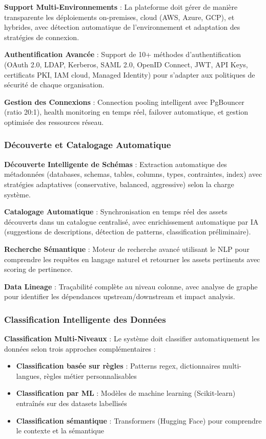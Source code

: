 \textbf{Support Multi-Environnements} : La plateforme doit gérer de manière transparente les déploiements on-premises, cloud (AWS, Azure, GCP), et hybrides, avec détection automatique de l'environnement et adaptation des stratégies de connexion.

\textbf{Authentification Avancée} : Support de 10+ méthodes d'authentification (OAuth 2.0, LDAP, Kerberos, SAML 2.0, OpenID Connect, JWT, API Keys, certificats PKI, IAM cloud, Managed Identity) pour s'adapter aux politiques de sécurité de chaque organisation.

\textbf{Gestion des Connexions} : Connection pooling intelligent avec PgBouncer (ratio 20:1), health monitoring en temps réel, failover automatique, et gestion optimisée des ressources réseau.

\subsubsection{Découverte et Catalogage Automatique}

\textbf{Découverte Intelligente de Schémas} : Extraction automatique des métadonnées (databases, schemas, tables, columns, types, contraintes, index) avec stratégies adaptatives (conservative, balanced, aggressive) selon la charge système.

\textbf{Catalogage Automatique} : Synchronisation en temps réel des assets découverts dans un catalogue centralisé, avec enrichissement automatique par IA (suggestions de descriptions, détection de patterns, classification préliminaire).

\textbf{Recherche Sémantique} : Moteur de recherche avancé utilisant le NLP pour comprendre les requêtes en langage naturel et retourner les assets pertinents avec scoring de pertinence.

\textbf{Data Lineage} : Traçabilité complète au niveau colonne, avec analyse de graphe pour identifier les dépendances upstream/downstream et impact analysis.

\subsubsection{Classification Intelligente des Données}

\textbf{Classification Multi-Niveaux} : Le système doit classifier automatiquement les données selon trois approches complémentaires :
\begin{itemize}
    \item \textbf{Classification basée sur règles} : Patterns regex, dictionnaires multi-langues, règles métier personnalisables
    \item \textbf{Classification par ML} : Modèles de machine learning (Scikit-learn) entraînés sur des datasets labellisés
    \item \textbf{Classification sémantique} : Transformers (Hugging Face) pour comprendre le contexte et la sémantique
\end{itemize}

